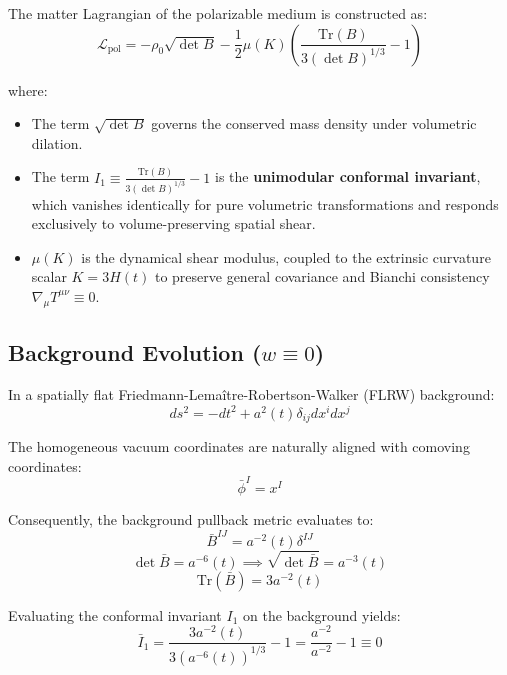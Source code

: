 \documentclass[10pt,twocolumn]{article}
\begin{document}
The matter Lagrangian of the polarizable medium is constructed as:
\begin{equation}
  \mathcal{L}_{\text{pol}} = -\rho_0 \sqrt{\det B} - \frac{1}{2} \mu(K) \left( \frac{\text{Tr}(B)}{3 (\det B)^{1/3}} - 1 \right)
\end{equation}

where:
\begin{itemize}
  \item The term $\sqrt{\det B}$ governs the conserved mass density under volumetric dilation.
  \item The term $I_1 \equiv \frac{\text{Tr}(B)}{3 (\det B)^{1/3}} - 1$ is the \textbf{unimodular conformal invariant}, which vanishes identically for pure volumetric transformations and responds exclusively to volume-preserving spatial shear.
  \item $\mu(K)$ is the dynamical shear modulus, coupled to the extrinsic curvature scalar $K = 3H(t)$ to preserve general covariance and Bianchi consistency $\nabla_\mu T^{\mu\nu} \equiv 0$.
\end{itemize}


\subsection{Background Evolution ($w \equiv 0$)}

In a spatially flat Friedmann-Lemaître-Robertson-Walker (FLRW) background:
\begin{equation}
  ds^2 = -dt^2 + a^2(t) \delta_{ij} dx^i dx^j
\end{equation}

The homogeneous vacuum coordinates are naturally aligned with comoving coordinates:
\begin{equation}
  \bar{\phi}^I = x^I
\end{equation}

Consequently, the background pullback metric evaluates to:
\begin{equation}
  \bar{B}^{IJ} = a^{-2}(t) \delta^{IJ}
\end{equation}
\begin{equation}
  \det \bar{B} = a^{-6}(t) \implies \sqrt{\det \bar{B}} = a^{-3}(t)
\end{equation}
\begin{equation}
  \text{Tr}(\bar{B}) = 3 a^{-2}(t)
\end{equation}

Evaluating the conformal invariant $I_1$ on the background yields:
\begin{equation}
  \bar{I}_1 = \frac{3 a^{-2}(t)}{3 (a^{-6}(t))^{1/3}} - 1 = \frac{a^{-2}}{a^{-2}} - 1 \equiv 0
\end{equation}
\end{document}
